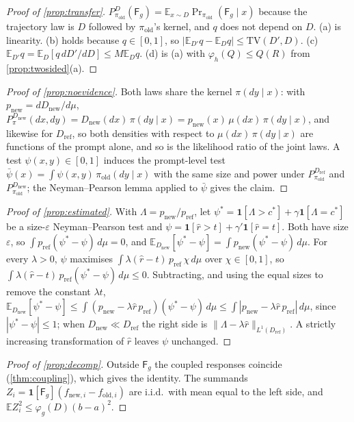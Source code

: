 \documentclass{article}
\theoremstyle{plain}
\theoremstyle{definition}
\theoremstyle{remark}
\newcommand{\E}{\mathbb{E}}
\newcommand{\TV}{\mathrm{TV}}
\newcommand{\Dref}{D_{\mathrm{ref}}}
\newcommand{\Dnew}{D_{\mathrm{new}}}
\newcommand{\pold}{\pi_{\mathrm{old}}}
\newcommand{\Fire}{\mathsf{F}}
\newcommand{\ind}{\mathbf{1}}
\begin{document}
\begin{proof}[Proof of \cref{prop:transfer}]
$P^D_{\pold}(\Fire_g)=\E_{x\sim D}\Pr_{\pold}(\Fire_g\mid x)$ because the trajectory law is $D$ followed by $\pold$'s
kernel, and $q$ does not depend on $D$. (a) is linearity. (b) holds because $q\in[0,1]$, so
$|\E_{D'}q-\E_Dq|\le\TV(D',D)$. (c) $\E_{D'}q=\E_D[q\,dD'/dD]\le M\E_Dq$. (d) is (a) with
$\varphi_h(Q)\le Q(R)$ from \cref{prop:twosided}(a).
\end{proof}

\begin{proof}[Proof of \cref{prop:noevidence}]
Both laws share the kernel $\pi(dy\mid x)$: with $p_{\mathrm{new}}=d\Dnew/d\mu$,
$P^{\Dnew}_\pi(dx,dy)=\Dnew(dx)\,\pi(dy\mid x)=p_{\mathrm{new}}(x)\,\mu(dx)\,\pi(dy\mid x)$, and likewise for $\Dref$, so
both densities with respect to $\mu(dx)\,\pi(dy\mid x)$ are functions of the prompt alone, and so is the likelihood
ratio of the joint laws. A test $\psi(x,y)\in[0,1]$ induces the prompt-level test
$\bar\psi(x)=\int\psi(x,y)\,\pold(dy\mid x)$ with the same size and power under $P^{\Dref}_{\pold}$ and
$P^{\Dnew}_{\pold}$; the Neyman--Pearson lemma applied to $\bar\psi$ gives the claim.
\end{proof}

\begin{proof}[Proof of \cref{prop:estimated}]
With $\Lambda=p_{\mathrm{new}}/p_{\mathrm{ref}}$, let $\psi^\ast=\ind[\Lambda>c^\ast]+\gamma\ind[\Lambda=c^\ast]$ be
a size-$\varepsilon$ Neyman--Pearson test and $\psi=\ind[\hat r>t]+\gamma'\ind[\hat r=t]$. Both have size
$\varepsilon$, so $\int p_{\mathrm{ref}}(\psi^\ast-\psi)\,d\mu=0$, and
$\E_{\Dnew}[\psi^\ast-\psi]=\int p_{\mathrm{new}}(\psi^\ast-\psi)\,d\mu$. For every $\lambda>0$, $\psi$ maximises
$\int\lambda(\hat r-t)\,p_{\mathrm{ref}}\,\chi\,d\mu$ over $\chi\in[0,1]$, so
$\int\lambda(\hat r-t)\,p_{\mathrm{ref}}(\psi^\ast-\psi)\,d\mu\le0$. Subtracting, and using the equal sizes to remove
the constant $\lambda t$,
$\E_{\Dnew}[\psi^\ast-\psi]\le\int(p_{\mathrm{new}}-\lambda\hat r\,p_{\mathrm{ref}})(\psi^\ast-\psi)\,d\mu\le
\int|p_{\mathrm{new}}-\lambda\hat r\,p_{\mathrm{ref}}|\,d\mu$, since $|\psi^\ast-\psi|\le1$; when $\Dnew\ll\Dref$ the
right side is $\|\Lambda-\lambda\hat r\|_{L^1(\Dref)}$. A strictly increasing transformation of $\hat r$ leaves $\psi$
unchanged.
\end{proof}

\begin{proof}[Proof of \cref{prop:decomp}]
Outside $\Fire_g$ the coupled responses coincide (\cref{thm:coupling}), which gives the identity. The summands
$Z_i=\ind[\Fire_g](f_{\mathrm{new},i}-f_{\mathrm{old},i})$ are i.i.d.\ with mean equal to the left side, and
$\E Z_i^2\le\varphi_g(D)(b-a)^2$.
\end{proof}
\end{document}
